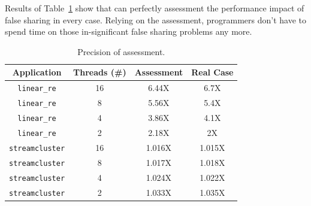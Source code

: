 Results of Table~\ref{tbl: precision} show that \cheetah{} can perfectly assessment the performance impact of false sharing in every case. Relying on the assessment, programmers don't have to spend time on those in-significant false sharing problems any more. 


\begin{table}
  \small
  \centering
  \begin{tabular}{ c | c | c | c}
  \textbf{Application} & {Threads (\#)} & \textbf{Assessment} & \textbf{Real Case} \\ \hline
\texttt{linear\_re} & 16 & 6.44X    & 6.7X \\
\texttt{linear\_re}& 8  & 5.56X    & 5.4X \\
\texttt{linear\_re} & 4  & 3.86X  & 4.1X  \\
 \texttt{linear\_re}& 2  & 2.18X  & 2X    \\ \hline
 \texttt{streamcluster} & 16 & 1.016X    & 1.015X \\
 \texttt{streamcluster} & 8 & 1.017X    & 1.018X \\
 \texttt{streamcluster} & 4 & 1.024X    & 1.022X \\
 \texttt{streamcluster} & 2 & 1.033X    & 1.035X \\
\end{tabular}
  \caption{
    Precision of assessment. \label{tbl: precision}}
\end{table}